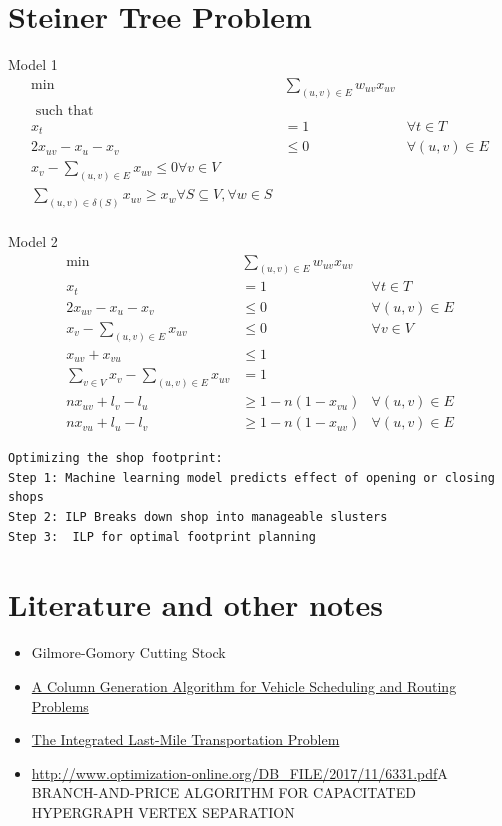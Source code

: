 \section{Steiner Tree Problem}


Model 1
\begin{align*}
\min \ \ \ & \sum_{(u,v) \in E} w_{uv} x_{uv}\\
\text{ such that }  \ \ \ \\
x_t & = 1 & \forall t \in T \\
2x_{uv} - x_u - x_v &\leq 0 &   \forall (u,v) \in E\\
x_v - \sum_{(u,v) \in E} x_{uv} \leq 0 \forall v \in V\\
\sum_{(u,v) \in \delta(S)} x_{uv} \geq x_w \forall S \subseteq V, \forall w \in S\\
\end{align*}

Model 2
\begin{align*}
\min &\sum_{(u,v) \in E} w_{uv} x_{uv}\\
x_t &= 1 &\forall t \in T\\
2x_{uv} - x_u - x_v &\leq 0 & \forall (u,v) \in E\\
x_v - \sum_{(u,v) \in E} x_{uv} &\leq 0 &\forall v \in V\\
x_{uv} + x_{vu} &\leq 1\\
\sum_{v \in V} x_v - \sum_{(u,v) \in E} x_{uv} &=1&\\
n x_{uv} + l_v - l_u &\geq 1 - n(1-x_{vu}) &\forall (u,v) \in E\\
n x_{vu} + l_u - l_v &\geq 1 - n(1-x_{uv}) &\forall (u,v) \in E
\end{align*}

\begin{verbatim}
Optimizing the shop footprint:
Step 1: Machine learning model predicts effect of opening or closing shops
Step 2: ILP Breaks down shop into manageable slusters
Step 3:  ILP for optimal footprint planning
\end{verbatim}




\section{Literature and other notes}


\begin{itemize}
\item Gilmore-Gomory Cutting Stock~\cite{Gilmore-Gomory}
\item \href{http://www.optimization-online.org/DB_HTML/2018/06/6648.html}{A Column Generation Algorithm for Vehicle Scheduling and Routing Problems}
\item \href{http://www.optimization-online.org/DB_HTML/2018/06/6670.html}{The Integrated Last-Mile Transportation Problem}
\item \url{http://www.optimization-online.org/DB_FILE/2017/11/6331.pdf}{A BRANCH-AND-PRICE ALGORITHM FOR CAPACITATED
HYPERGRAPH VERTEX SEPARATION}
\end{itemize}
